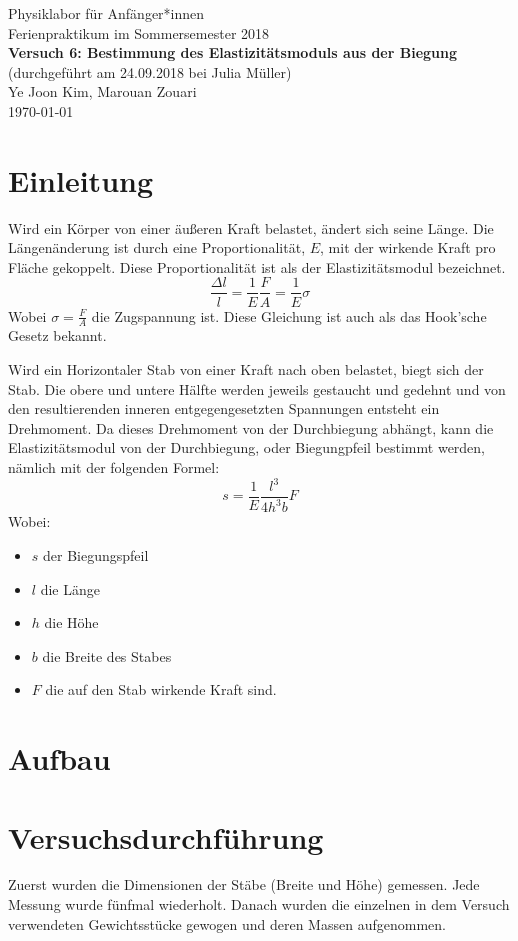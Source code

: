 \documentclass[11pt,a4paper]{article}
\begin{document}
{
	\centering 
	\large 
	Physiklabor für Anfänger*innen \\
	Ferienpraktikum im Sommersemester 2018 \\[4mm]
	\textbf{\LARGE 
		Versuch 6: Bestimmung des Elastizitätsmoduls aus der Biegung
	} \\[3mm]
	(durchgeführt am 24.09.2018 bei Julia Müller) \\
	Ye Joon Kim, Marouan Zouari\\
	\today \\[10mm]
}
\tableofcontents

\section{Einleitung}
Wird ein Körper von einer äußeren Kraft belastet, ändert sich seine Länge. Die Längenänderung ist durch eine Proportionalität, $E$, mit der wirkende Kraft pro Fläche gekoppelt. Diese Proportionalität ist als der Elastizitätsmodul bezeichnet. 
\begin{equation}
\frac{\Delta l}{l} = \frac{1}{E}\frac{F}{A} = \frac{1}{E}\sigma
\end{equation}
Wobei $\sigma = \frac{F}{A}$ die Zugspannung ist. Diese Gleichung ist auch als das Hook'sche Gesetz bekannt.

Wird ein Horizontaler Stab von einer Kraft nach oben belastet, biegt sich der Stab. Die obere und untere Hälfte werden jeweils gestaucht und gedehnt und von den resultierenden inneren entgegengesetzten Spannungen entsteht ein Drehmoment. Da dieses Drehmoment von der Durchbiegung abhängt, kann die Elastizitätsmodul von der Durchbiegung, oder Biegungpfeil bestimmt werden, nämlich mit der folgenden Formel:
\begin{equation}
s = \frac{1}{E}\frac{l^3}{4h^3b}F
\end{equation}
Wobei:
\begin{itemize}
	\item $s$ der Biegungspfeil
	\item $l$ die Länge 
	\item $h$ die Höhe
	\item $b$ die Breite des Stabes
	\item $F$ die auf den Stab wirkende Kraft sind.
\end{itemize}
\section{Aufbau}

\section{Versuchsdurchführung}
Zuerst wurden die Dimensionen der Stäbe (Breite und Höhe) gemessen. Jede Messung wurde fünfmal wiederholt. Danach wurden die einzelnen in dem Versuch verwendeten Gewichtsstücke gewogen und deren Massen aufgenommen. 
\end{document}
